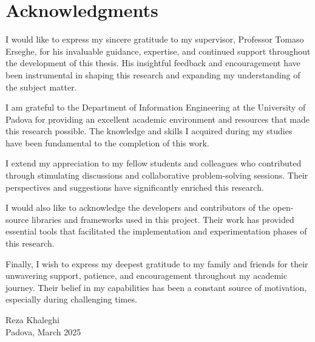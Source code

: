 \chapter*{Acknowledgments}

I would like to express my sincere gratitude to my supervisor, Professor Tomaso Erseghe, for his invaluable guidance, expertise, and continued support throughout the development of this thesis. His insightful feedback and encouragement have been instrumental in shaping this research and expanding my understanding of the subject matter.

I am grateful to the Department of Information Engineering at the University of Padova for providing an excellent academic environment and resources that made this research possible. The knowledge and skills I acquired during my studies have been fundamental to the completion of this work.

I extend my appreciation to my fellow students and colleagues who contributed through stimulating discussions and collaborative problem-solving sessions. Their perspectives and suggestions have significantly enriched this research.

I would also like to acknowledge the developers and contributors of the open-source libraries and frameworks used in this project. Their work has provided essential tools that facilitated the implementation and experimentation phases of this research.

Finally, I wish to express my deepest gratitude to my family and friends for their unwavering support, patience, and encouragement throughout my academic journey. Their belief in my capabilities has been a constant source of motivation, especially during challenging times.

\vspace{1cm}

\begin{flushright}
Reza Khaleghi\\
Padova, March 2025
\end{flushright}